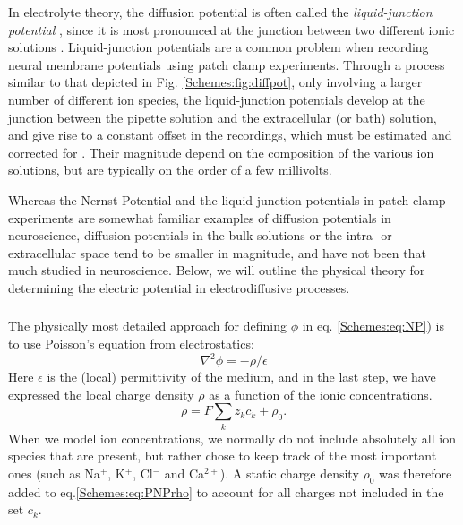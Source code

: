 In electrolyte theory, the diffusion potential is often called the \textit{liquid-junction potential} , since it is most pronounced at the junction between two different ionic solutions \citep{Sokalski2001}. Liquid-junction potentials are a common problem when recording neural membrane potentials using patch clamp experiments. Through a process similar to that depicted in Fig. \ref{Schemes:fig:diffpot}, only involving a larger number of different ion species, 
the liquid-junction potentials develop at the junction between the pipette solution and the extracellular (or bath) solution, and give rise to a constant offset in the recordings, which must be estimated and corrected for \citep{barry1991}. Their magnitude depend on the composition of the various ion solutions, but are typically on the order of a few millivolts. 

Whereas the Nernst-Potential and the liquid-junction potentials in patch clamp experiments are somewhat familiar examples of diffusion potentials in neuroscience, diffusion potentials in the bulk solutions or the intra- or extracellular space tend to be smaller in magnitude, and have not been that much studied in neuroscience. Below, we will outline the physical theory for determining the electric potential in electrodiffusive processes.


\subsubsection{}
\label{sec:Schemes:PNP}
The physically most detailed approach for defining $\phi$ in eq. \ref{Schemes:eq:NP}) is to use Poisson's equation from electrostatics:
\begin{equation}
\nabla^2 \phi = -\rho/\epsilon
\label{Schemes:eq:poisson}
\end{equation}
Here $\epsilon$ is the (local) permittivity of the medium, and in the last step, we have expressed the local charge density $\rho$ as a function of the ionic concentrations. 
\begin{equation}
\rho = F\sum_k z_k c_k + \rho_0.
\label{Schemes:eq:PNPrho}
\end{equation}
When we model ion concentrations, we normally do not include absolutely all ion species that are present, but rather chose to keep track of the most important ones (such as Na$^+$, K$^+$, Cl$^-$ and Ca$^{2+}$). A static charge density $\rho_0$ was therefore added to eq.\ref{Schemes:eq:PNPrho} to account for all charges not included in the set $c_k$. 


